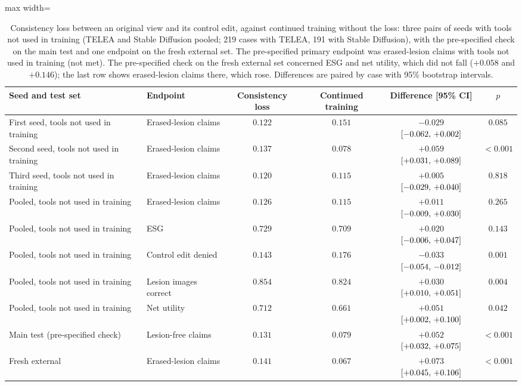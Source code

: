 \begin{table}[!htbp]
\caption{Consistency loss between an original view and its control edit, against continued training without the loss: three pairs of seeds with tools not used in training (TELEA and Stable Diffusion pooled; 219 cases with TELEA, 191 with Stable Diffusion), with the pre-specified check on the main test and one endpoint on the fresh external set. The pre-specified primary endpoint was erased-lesion claims with tools not used in training (not met). The pre-specified check on the fresh external set concerned ESG and net utility, which did not fall ($+0.058$ and $+0.146$); the last row shows erased-lesion claims there, which rose. Differences are paired by case with 95\% bootstrap intervals.}
\label{tab:s_designs_cons}
\centering
\footnotesize
\begin{adjustbox}{max width=\linewidth}
\begin{tabular}{llcccc}
\toprule
Seed and test set & Endpoint & Consistency loss & Continued training & Difference [95\% CI] & $p$ \\
\midrule
First seed, tools not used in training & Erased-lesion claims & $0.122$ & $0.151$ & $-0.029$ $[-0.062,\,+0.002]$ & $0.085$ \\
Second seed, tools not used in training & Erased-lesion claims & $0.137$ & $0.078$ & $+0.059$ $[+0.031,\,+0.089]$ & $<0.001$ \\
Third seed, tools not used in training & Erased-lesion claims & $0.120$ & $0.115$ & $+0.005$ $[-0.029,\,+0.040]$ & $0.818$ \\
\midrule
Pooled, tools not used in training & Erased-lesion claims & $0.126$ & $0.115$ & $+0.011$ $[-0.009,\,+0.030]$ & $0.265$ \\
Pooled, tools not used in training & ESG & $0.729$ & $0.709$ & $+0.020$ $[-0.006,\,+0.047]$ & $0.143$ \\
Pooled, tools not used in training & Control edit denied & $0.143$ & $0.176$ & $-0.033$ $[-0.054,\,-0.012]$ & $0.001$ \\
Pooled, tools not used in training & Lesion images correct & $0.854$ & $0.824$ & $+0.030$ $[+0.010,\,+0.051]$ & $0.004$ \\
Pooled, tools not used in training & Net utility & $0.712$ & $0.661$ & $+0.051$ $[+0.002,\,+0.100]$ & $0.042$ \\
\midrule
Main test (pre-specified check) & Lesion-free claims & $0.131$ & $0.079$ & $+0.052$ $[+0.032,\,+0.075]$ & $<0.001$ \\
Fresh external & Erased-lesion claims & $0.141$ & $0.067$ & $+0.073$ $[+0.045,\,+0.106]$ & $<0.001$ \\
\bottomrule
\end{tabular}
\end{adjustbox}
\end{table}

